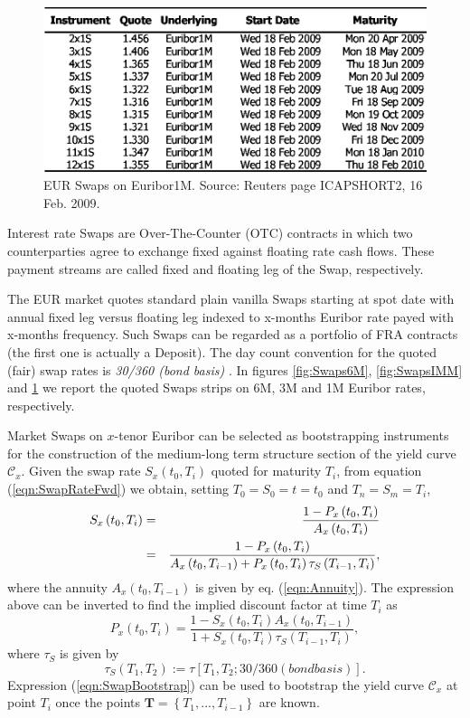 \documentclass[11pt,reqno]{amsart}
\begin{document}
\begin{figure}[tbp]
\centering
\includegraphics[scale=0.9]{../figures/FigMktSwaps1M}
\caption{EUR Swaps on Euribor1M. Source: Reuters page ICAPSHORT2, 16 Feb. 2009.}
\label{fig:Swaps1M}
\end{figure}

Interest rate Swaps are Over-The-Counter (OTC) contracts in which two counterparties agree to exchange fixed against floating rate cash flows. These payment streams are called fixed and floating leg of the Swap, respectively.
\par
The EUR market quotes standard plain vanilla Swaps starting at spot date with annual fixed leg versus floating leg indexed to x-months Euribor rate payed with x-months frequency. Such Swaps can be regarded as a portfolio of FRA contracts (the first one is actually a Deposit). The day count convention for the quoted (fair) swap rates is \emph{30/360 (bond basis)} \cite{ISDA}.
In figures \ref{fig:Swaps6M}, \ref{fig:SwapsIMM} and \ref{fig:Swaps1M} we report the quoted Swaps strips on 6M, 3M and 1M Euribor rates, respectively.
\par
Market Swaps on $x$-tenor Euribor can be selected as bootstrapping instruments for the construction of the medium-long term structure section of the yield curve $\mathcal{C}_x$.
Given the swap rate $S_x\left(t_0,T_i\right)$ quoted for maturity $T_i$, from equation (\ref{eqn:SwapRateFwd}) we obtain, setting $T_0=S_0=t=t_0$ and $T_n=S_m=T_i$,
\begin{eqnarray}
S_x\left(t_0,T_i\right)
&=& \frac{1 - P_x\left(t_0,T_i\right)}
         {A_x\left(t_0,T_i\right)} \notag\\
&=& \frac{1 - P_x\left(t_0,T_i\right)}
         {A_x\left(t_0,T_{i-1}\right)+P_x\left(t_0,T_i\right)\tau_S\left(T_{i-1},T_i\right)},
\label{eqn:SwapRateMkt}
\end{eqnarray}
where the annuity $A_x\left(t_0,T_{i-1}\right)$ is given by eq. (\ref{eqn:Annuity}).
The expression above can be inverted to find the implied discount factor at time $T_i$ as
\begin{equation}
P_x\left(t_0,T_i\right)
=   \frac{1-S_x\left(t_0,T_i\right)A_x\left(t_0,T_{i-1}\right)}
         {1+S_x\left(t_0,T_i\right)\tau_S\left(T_{i-1},T_i\right)},
\label{eqn:SwapBootstrap}
\end{equation}
where $\tau_S$ is given by
\begin{equation}
\tau_S\left(T_1,T_2\right) := \tau\left[T_1,T_2;30/360 (bond basis)\right].
\end{equation}
Expression (\ref{eqn:SwapBootstrap}) can be used to bootstrap the yield curve $\mathcal{C}_x$ at point $T_i$ once the points $\mathbf{T=}\left\{T_1,...,T_{i-1}\right\}$ are known.
\end{document}
